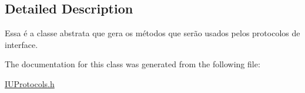 \subsection{Detailed Description}
Essa é a classe abstrata que gera os métodos que serão usados pelos protocolos de interface. 

The documentation for this class was generated from the following file\-:\begin{DoxyCompactItemize}
\item 
\hyperlink{_i_u_protocols_8h}{I\-U\-Protocols.\-h}\end{DoxyCompactItemize}
